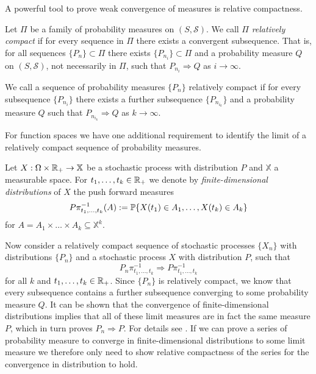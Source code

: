 A powerful tool to prove weak convergence of measures is relative compactness.
\begin{definition} \label{D: rel compactness}
	Let $\Pi$ be a family of probability measures on $(S, \mathcal{S})$.
	We call $\Pi$ \emph{relatively compact} if for every sequence in $\Pi$ there exists a convergent subsequence.
	That is, for all sequences $\{P_n\} \subset \Pi$ there exists $\{P_{n_i} \} \subset \Pi$
	and a probability measure $Q$ on $(S, \mathcal{S})$, not necessarily in $\Pi$,
	such that $P_{n_i} \Rightarrow Q$ as $i \rightarrow \infty$.
	
	We call a sequence of probability measures $\{P_n\}$ relatively compact if
	for every subsequence $\{P_{n_i}\}$ there exists a further subsequence
	$\{P_{n_{i_k}}\}$ and a probability measure $Q$ such that
	$P_{n_{i_k}} \Rightarrow Q$ as $k \rightarrow \infty$.
\end{definition}
For function spaces we have one additional requirement to identify the limit of a relatively compact sequence of probability measures.
\begin{definition} \label{D: fidi distributions}
	Let $X: \Omega \times \mathbb{R}_+ \rightarrow \mathbb{X}$ 
	be a stochastic process with distribution $P$ and $\mathbb{X}$ a measurable space.
	For $t_1, \dots, t_k \in \mathbb{R}_+$ we denote by \emph{finite-dimensional distributions} of $X$ 
	the push forward measures 
	\begin{equation}
		P\pi^{-1}_{t_1, \dots, t_k}(A) := \mathbb{P}\{ X(t_1) \in A_1, \dots, X(t_k) \in A_k \}
	\end{equation}
	for $A = A_1 \times \dots \times A_k \subseteq \mathbb{X}^k$.
\end{definition}

Now consider a relatively compact sequence of stochastic processes $\{X_n\}$
with distributions $\{P_n\}$
and a stochastic process $X$ with distribution $P$,
such that
\begin{equation}
	P_n\pi^{-1}_{t_1, \dots, t_k} \Rightarrow P\pi^{-1}_{t_1, \dots, t_k}
\end{equation}
for all $k$ and $t_1, \dots, t_k \in \mathbb{R}_+$.
Since $\{P_n\}$ is relatively compact,
we know that every subsequence contains a further subsequence converging to some probability measure $Q$.
It can be shown that the convergence of finite-dimensional distributions implies that all of these
limit measures are in fact the same measure $P$,
which in turn proves $P_n \Rightarrow P$. For details see \cite[p.57f.]{Billingsley.1999}.
If we can prove a series of probability measure to converge in finite-dimensional distributions to some
limit measure we therefore only need to show relative compactness of the series
for the convergence in distribution to hold.

